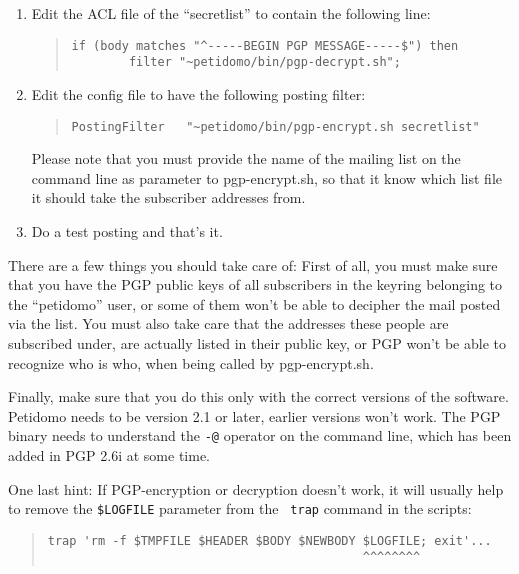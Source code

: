 \documentclass[a4paper,10pt]{scrreprt}
\newcommand{\file}[1]{{\sf #1}}
\begin{document}
\begin{enumerate}
\item Edit the ACL file of the ``secretlist'' to contain the following
line:

\begin{quote}
\begin{verbatim}
if (body matches "^-----BEGIN PGP MESSAGE-----$") then
        filter "~petidomo/bin/pgp-decrypt.sh";
\end{verbatim}
\end{quote}

\item Edit the config file to have the following posting filter:

\begin{quote}
\begin{verbatim}
PostingFilter   "~petidomo/bin/pgp-encrypt.sh secretlist"
\end{verbatim}
\end{quote}

Please note that you must provide the name of the mailing list on the
command line as parameter to \file{pgp-encrypt.sh}, so that it know
which list file it should take the subscriber addresses from.

\item Do a test posting and that's it.

\end{enumerate}

There are a few things you should take care of: First of all, you must
make sure that you have the PGP public keys of all subscribers in the
keyring belonging to the ``petidomo'' user, or some of them won't be
able to decipher the mail posted via the list. You must also take care
that the addresses these people are subscribed under, are actually
listed in their public key, or PGP won't be able to recognize who is
who, when being called by \file{pgp-encrypt.sh}.

Finally, make sure that you do this only with the correct versions of
the software. Petidomo needs to be version 2.1 or later, earlier
versions won't work. The PGP binary needs to understand the {\tt -@}
operator on the command line, which has been added in PGP 2.6i at some
time.

One last hint: If PGP-encryption or decryption doesn't work, it will
usually help to remove the {\tt \$LOGFILE} parameter from the {\tt
trap} command in the scripts:

\begin{quote}
\begin{verbatim}
trap 'rm -f $TMPFILE $HEADER $BODY $NEWBODY $LOGFILE; exit'...
                                            ^^^^^^^^
\end{verbatim}
\end{quote}
\end{document}
